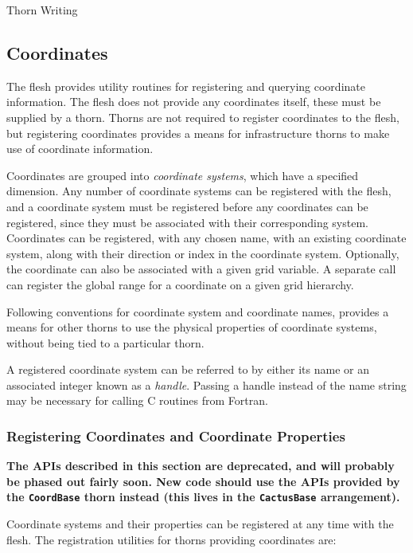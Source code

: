 \begin{cactuspart}{Thorn Writing}
\subsection{Coordinates}
\label{sec:CactusAPI.coordinates}

The flesh provides utility routines for registering and querying
coordinate information. The flesh does not provide any coordinates
itself, these must be supplied by a thorn. Thorns are not required to
register coordinates to the flesh, but registering coordinates
provides a means for infrastructure thorns to make use of coordinate
information.

Coordinates are grouped into \textit{coordinate systems}, which have a
specified dimension. Any number of coordinate systems can be
registered with the flesh, and a coordinate system must be registered
before any coordinates can be registered, since they must be
associated with their corresponding system.  Coordinates can be
registered, with any chosen name, with an existing coordinate system,
along with their direction or index in the coordinate system.
Optionally, the coordinate can also be associated with a given grid
variable.  A separate call can register the global range for a
coordinate on a given grid hierarchy.

Following conventions for coordinate system and coordinate names,
provides a means for other thorns to use the physical properties of
coordinate systems, without being tied to a particular thorn.

A registered coordinate system can be referred to by either its name or
an associated integer known as a \textit{handle}. Passing a handle instead
of the name string may be necessary for calling C routines from Fortran.


\subsubsection{Registering Coordinates and Coordinate Properties}

\textbf{The APIs described in this section are deprecated, and will
probably be phased out fairly soon.
New code should use the APIs provided by the \texttt{CoordBase} thorn
instead (this lives in the \texttt{CactusBase} arrangement).}

Coordinate systems and their properties can be registered at any time with the flesh.
The registration utilities for thorns providing coordinates are:
\begin{Lentry}


\end{Lentry}
\end{cactuspart}
